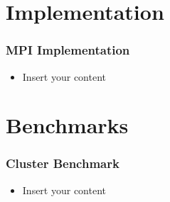 \documentclass[10pt]{beamer}
\begin{document}
\section{Implementation}
\begin{frame}
	\frametitle{MPI Implementation}
	\begin{itemize}
		\item Insert your content
	\end{itemize}
\end{frame}

\section{Benchmarks}
\begin{frame}
	\frametitle{Cluster Benchmark}
	\begin{itemize}
		\item Insert your content
	\end{itemize}
\end{frame}
\end{document}
